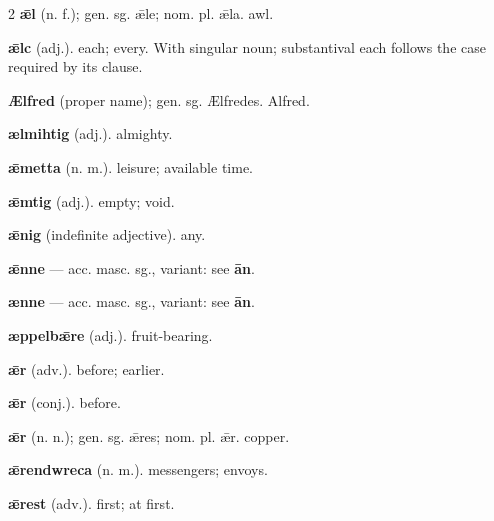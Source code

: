 \begin{multicols*}{2}
\textbf{ǣl} (n. f.); gen. sg. ǣle; nom. pl. ǣla. awl.\par
\textbf{ǣlc} (adj.). each; every. With singular noun; substantival each follows the case required by its clause.\par
\textbf{Ælfred} (proper name); gen. sg. Ælfredes. Alfred.\par
\textbf{ælmihtig} (adj.). almighty.\par
\textbf{ǣmetta} (n. m.). leisure; available time.\par
\textbf{ǣmtig} (adj.). empty; void.\par
\textbf{ǣnig} (indefinite adjective). any.\par
\textbf{ǣnne} — acc. masc. sg., variant: see \textbf{ān}.\par
\textbf{ænne} — acc. masc. sg., variant: see \textbf{ān}.\par
\textbf{æppelbǣre} (adj.). fruit-bearing.\par
\textbf{ǣr} (adv.). before; earlier.\par
\textbf{ǣr} (conj.). before.\par
\textbf{ǣr} (n. n.); gen. sg. ǣres; nom. pl. ǣr. copper.\par
\textbf{ǣrendwreca} (n. m.). messengers; envoys.\par
\textbf{ǣrest} (adv.). first; at first.\par

\end{multicols*}
